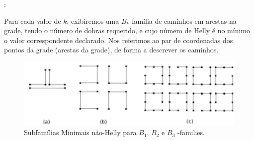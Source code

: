 \proof:

Para cada valor de  $k$, exibiremos uma $B_k$-família de caminhos em arestas na grade, tendo o número de dobras requerido, e cujo número de Helly é no mínimo o valor correspondente declarado. Nos referimos ao par de coordenadas dos pontos da grade (arestas da grade), de forma a descrever os caminhos.

\begin{figure}[!h]
\begin{center}
\includegraphics[width=12cm]{./img/b1epgSub.pdf}
\end{center}
\caption{Subfamílias Minimais não-Helly para $B_1$, $B_2$ e $B_3$ -families.}
\label{fig:b1b2b3families}
\end{figure}

